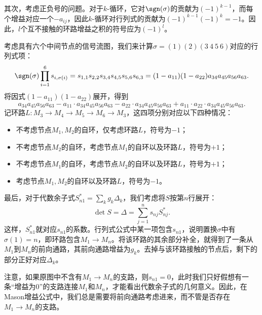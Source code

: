 其次，考虑正负号的问题。对于$k$-循环，它对$\sgn(\sigma)$的贡献为$(-1)^{k-1}$，而每个增益对应一个$-a_{ij}$，因此$k$-循环对行列式的贡献为$(-1)^{k-1}(-1)^k=-1$。因此，$l$个互不接触的环路增益之积的符号应为$(-1)^l$。
\begin{example}
    考虑具有六个中间节点的信号流图，我们来计算$\sigma=(1)(2)(3\ 4\ 5\ 6)$对应的行列式项：
    \begin{equation}
        \sgn(\sigma)\prod_{i=1}^{6}s_{i,\sigma(i)}=s_{1,1}s_{2,2}s_{3,4}s_{4,5}s_{5,6}s_{6,3}=(1-a_{11})(1-a_{22})a_{34}a_{45}a_{56}a_{63}.
    \end{equation}
    将因式$(1-a_{11})(1-a_{22})$展开，得到
    \begin{equation}
        a_{34}a_{45}a_{56}a_{63}-a_{11}\cdot a_{34}a_{45}a_{56}a_{63}-a_{22}\cdot a_{34}a_{45}a_{56}a_{63}+a_{11}\cdot a_{22}\cdot a_{34}a_{45}a_{56}a_{63}.
    \end{equation}
    记环路$L:M_3\to M_4\to M_5\to M_6\to M_3$，这四项分别对应以下四种情况：
    \begin{itemize}
        \item 不考虑节点$M_1,M_2$的自环，仅考虑环路$L$，符号为$-1$；
        \item 不考虑节点$M_2$的自环，考虑节点$M_1$的自环以及环路$L$，符号为$+1$；
        \item 不考虑节点$M_1$的自环，考虑节点$M_2$的自环以及环路$L$，符号为$+1$；
        \item 考虑节点$M_1,M_2$的自环以及环路$L$，符号为$-1$。
    \end{itemize}
\end{example}

最后，对于代数余子式$S^*_{n1}=\sum_{k}g_k\Delta_k$，我们考虑将$S$按第$n$行展开：
\begin{equation}
    \det S=\Delta=\sum_{j=1}^{n}s_{nj}S^*_{nj}.
\end{equation}
这样，$S^*_{n1}$就对应$s_{n1}$的系数。行列式公式中某一项包含$s_{n1}$，说明置换$\sigma$中有$\sigma(1)=n$，即环路包含$M_1\to M_n$。将该环路的其余部分补全，就得到了一条从$M_1$到$M_n$的前向通路，其前向通路增益为$g_k$。去掉与该环路接触的节点后，剩下的部分正好对应$\Delta_k$。

注意，如果原图中不含有$M_1\to M_n$的支路，则$s_{n1}=0$，此时我们只好假想有一条“增益为$0$”的支路连接$M_1$和$M_n$，才能看出代数余子式的几何意义。因此，在Mason增益公式中，我们总是需要将前向通路考虑进来，而不管是否存在$M_1\to M_n$的支路。

